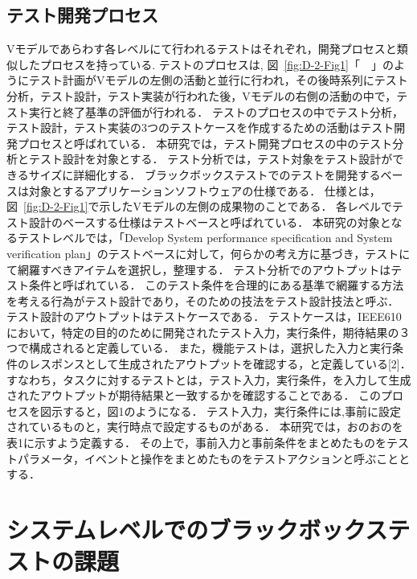 \documentclass[a4paper,11pt]{jreport}
\begin{document}
\subsection{テスト開発プロセス}
Vモデルであらわす各レベルにて行われるテストはそれぞれ，開発プロセスと類似したプロセスを持っている\cite{ISTQB}.
テストのプロセスは, 図~\ref{fig:D-2-Fig1}「　」のようにテスト計画がVモデルの左側の活動と並行に行われ，その後時系列にテスト分析，テスト設計，テスト実装が行われた後，Vモデルの右側の活動の中で，テスト実行と終了基準の評価が行われる．
テストのプロセスの中でテスト分析，テスト設計，テスト実装の3つのテストケースを作成するための活動はテスト開発プロセスと呼ばれている\cite{ISTQB}．
本研究では，テスト開発プロセスの中のテスト分析とテスト設計を対象とする．
テスト分析では，テスト対象をテスト設計ができるサイズに詳細化する．
ブラックボックステストでのテストを開発するベースは対象とするアプリケーションソフトウェアの仕様である．
仕様とは，図~\ref{fig:D-2-Fig1}で示したVモデルの左側の成果物のことである．
各レベルでテスト設計のベースする仕様はテストベースと呼ばれている．
本研究の対象となるテストレベルでは，「Develop System performance specification and System verification plan」のテストベースに対して，何らかの考え方に基づき，テストにて網羅すべきアイテムを選択し，整理する．
テスト分析でのアウトプットはテスト条件と呼ばれている．
このテスト条件を合理的にある基準で網羅する方法を考える行為がテスト設計であり，そのための技法をテスト設計技法と呼ぶ．
テスト設計のアウトプットはテストケースである．
テストケースは，IEEE610において，特定の目的のために開発されたテスト入力，実行条件，期待結果の３つで構成されると定義している．
また，機能テストは，選択した入力と実行条件のレスポンスとして生成されたアウトプットを確認する，と定義している[2]．
すなわち，タスクに対するテストとは，テスト入力，実行条件，を入力して生成されたアウトプットが期待結果と一致するかを確認することである．
このプロセスを図示すると，図1のようになる．
テスト入力，実行条件には,事前に設定されているものと，実行時点で設定するものがある．
本研究では，おのおのを表1に示すよう定義する．
その上で，事前入力と事前条件をまとめたものをテストパラメータ，イベントと操作をまとめたものをテストアクションと呼ぶこととする．

\section{システムレベルでのブラックボックステストの課題} \label{sec:2-2}
\end{document}
